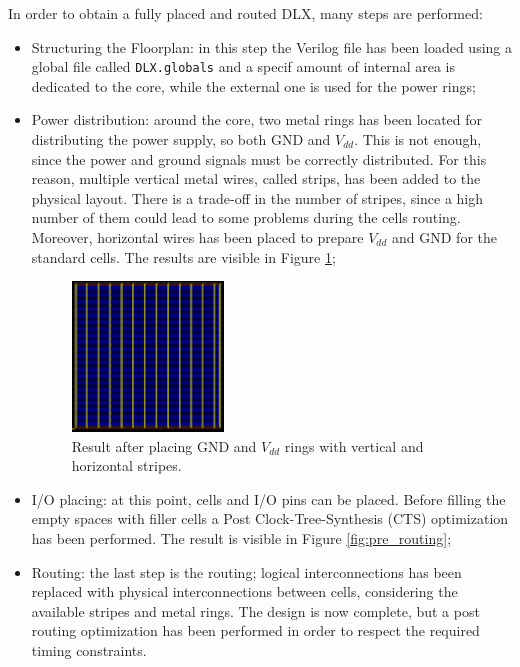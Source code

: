 In order to obtain a fully placed and routed DLX, many steps are performed:
\begin{itemize}
	\item Structuring the Floorplan: in this step the Verilog file has been loaded using a global file called \texttt{DLX.globals} and a specif amount of internal area is dedicated to the core, while the external one is used for the power rings;
	\item Power distribution: around the core, two metal rings has been located for distributing the power supply, so both GND and $V_{dd}$. This is not enough, since the power and ground signals must be correctly distributed. For this reason, multiple vertical metal wires, called strips, has been added to the physical layout. There is a trade-off in the number of stripes, since a high number of them could lead to some problems during the cells routing. Moreover, horizontal wires has been placed to prepare $V_{dd}$ and GND for the standard cells. The results are visible in Figure \ref{stripes};
	\begin{figure}[h]   
		\centering
		\includegraphics[width=0.38\textwidth]{chapters/9_PhysicalDesign/images/pwr_distribution.png}
		\caption{Result after placing GND and $V_{dd}$ rings with vertical and horizontal stripes.}
		\label{stripes}
	\end{figure}
	
	\item I/O placing: at this point, cells and I/O pins can be placed. Before filling the empty spaces with filler cells a Post Clock-Tree-Synthesis (CTS) optimization has been performed. The result is visible in Figure \ref{fig:pre_routing};
	\item Routing: the last step is the routing; logical interconnections has been replaced with physical interconnections between cells, considering the available stripes and metal rings. The design is now complete, but a post routing optimization has been performed in order to respect the required timing constraints.
\end{itemize}

